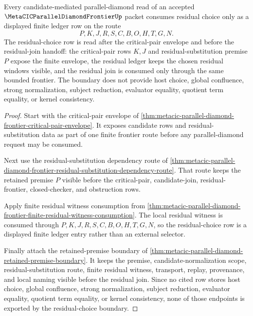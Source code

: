 \begin{theorem}
\label{thm:metacic-parallel-diamond-frontier-residual-choice-boundary}
Every candidate-mediated parallel-diamond read of an accepted $\MetaCICParallelDiamondFrontierUp$ packet consumes residual choice only as a displayed finite ledger row on the route
$$
P,K,J,R,S,C,B,O,H,T,G,N .
$$
The residual-choice row is read after the critical-pair envelope and before the residual-join handoff: the critical-pair rows $K,J$ and residual-substitution premise $P$ expose the finite envelope, the residual ledger keeps the chosen residual windows visible, and the residual join is consumed only through the same bounded frontier. The boundary does not provide host choice, global confluence, strong normalization, subject reduction, evaluator equality, quotient term equality, or kernel consistency.
\end{theorem}
\begin{proof}
Start with the critical-pair envelope of \autoref{thm:metacic-parallel-diamond-frontier-critical-pair-envelope}. It exposes candidate rows and residual-substitution data as part of one finite frontier route before any parallel-diamond request may be consumed.

Next use the residual-substitution dependency route of \autoref{thm:metacic-parallel-diamond-frontier-residual-substitution-dependency-route}. That route keeps the retained premise $P$ visible before the critical-pair, candidate-join, residual-frontier, closed-checker, and obstruction rows.

Apply finite residual witness consumption from \autoref{thm:metacic-parallel-diamond-frontier-finite-residual-witness-consumption}. The local residual witness is consumed through $P,K,J,R,S,C,B,O,H,T,G,N$, so the residual-choice row is a displayed finite ledger entry rather than an external selector.

Finally attach the retained-premise boundary of \autoref{thm:metacic-parallel-diamond-retained-premise-boundary}. It keeps the premise, candidate-normalization scope, residual-substitution route, finite residual witness, transport, replay, provenance, and local naming visible before the residual join. Since no cited row stores host choice, global confluence, strong normalization, subject reduction, evaluator equality, quotient term equality, or kernel consistency, none of those endpoints is exported by the residual-choice boundary.
\end{proof}
